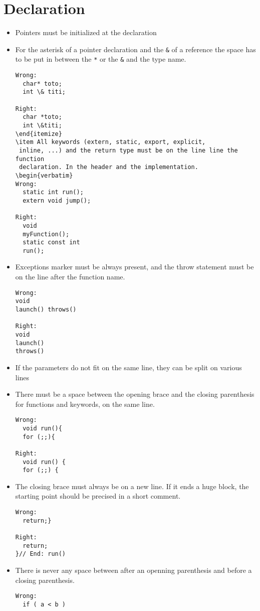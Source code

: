 \documentclass{article}
\begin{document}
\section{Declaration}
\begin{itemize}
\item Pointers must be initialized at the declaration
\item  For the asterisk of a pointer declaration and the \texttt{\&} of a 
reference the space has to be put in between the \texttt{*} or the 
\texttt{\&} and the type name.
 \begin{verbatim}
Wrong:
  char* toto;
  int \& titi;

Right:
  char *toto;
  int \&titi;
\end{itemize}
\item All keywords (extern, static, export, explicit,
 inline, ...) and the return type must be on the line line the function
 declaration. In the header and the implementation.
\begin{verbatim}
Wrong:
  static int run(); 
  extern void jump();

Right:
  void
  myFunction();
  static const int
  run();
\end{verbatim}
\item Exceptions marker must be always present, and the throw statement
must be on the line after the function name.
\begin{verbatim}
Wrong:
void 
launch() throws()

Right:
void
launch()
throws()
\end{verbatim}

\item If the parameters do not fit on the same line, they can be split on 
various lines
\item There must be a space between the opening brace and the closing
 parenthesis for functions and keywords, on the same line.
\begin{verbatim}
Wrong:
  void run(){
  for (;;){

Right:
  void run() {
  for (;;) {
\end{verbatim}

\item The closing brace must always be on a new line. If it ends a huge 
block, the starting point should be precised in a short comment.
\begin{verbatim}
Wrong:
  return;}

Right:
  return;
}// End: run()
\end{verbatim}
\item There is never any space between after an openning
 parenthesis and before a closing parenthesis.
\begin{verbatim}
Wrong:
  if ( a < b )


\end{verbatim}
\end{itemize}
\end{document}
